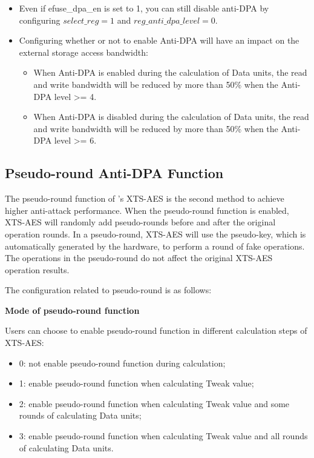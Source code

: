 \documentclass[main\_\_EN.tex]{subfiles}
\begin{document}
\begin{tiplisting}
\vspace{-2.5em}
    \begin{itemize}
        \item Even if efuse\_dpa\_en is set to 1, you can still disable anti-DPA by configuring $select\_reg = 1$ and $reg\_anti\_dpa\_level = 0$.
        \item Configuring whether or not to enable Anti-DPA will have an impact on the external storage access bandwidth:
            \begin{itemize}
                \item When Anti-DPA is enabled during the calculation of Data units, the read and write bandwidth will be reduced by more than 50\% when the Anti-DPA level >= 4.
                \item When Anti-DPA is disabled during the calculation of Data units, the read and write bandwidth will be reduced by more than 50\% when the Anti-DPA level >= 6.
            \end{itemize}
    \end{itemize}
\end{tiplisting}

\subsection{Pseudo-round Anti-DPA Function}

The pseudo-round function of \chipname{}'s XTS-AES is the second method to achieve higher anti-attack performance.
When the pseudo-round function is enabled, XTS-AES will randomly add pseudo-rounds before and after the original operation rounds. In a pseudo-round, XTS-AES will use the pseudo-key, which is automatically generated by the hardware, to perform a round of fake operations. The operations in the pseudo-round do not affect the original XTS-AES operation results.

The configuration related to pseudo-round is as follows:

\textbf{Mode of pseudo-round function}

Users can choose to enable pseudo-round function in different calculation steps of XTS-AES:
\begin{itemize}
    \item 0: not enable pseudo-round function during calculation;
    \item 1: enable pseudo-round function when calculating Tweak value;
    \item 2: enable pseudo-round function when calculating Tweak value and some rounds of calculating Data units;
    \item 3: enable pseudo-round function when calculating Tweak value and all rounds of calculating Data units.
\end{itemize}
\end{document}
